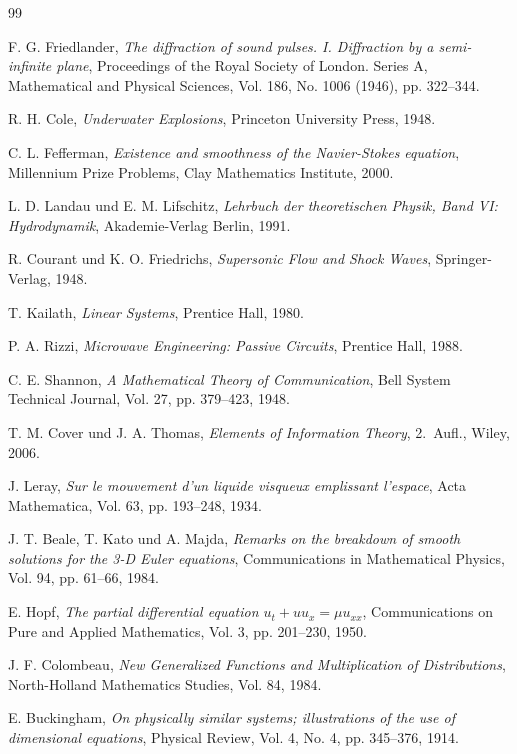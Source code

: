 ﻿\documentclass[12pt,a4paper]{article}
\theoremstyle{definition}
\theoremstyle{remark}
\begin{document}
\begin{thebibliography}{99}

F. G. Friedlander, \textit{The diffraction of sound pulses. I. Diffraction by a semi-infinite plane}, Proceedings of the Royal Society of London. Series A, Mathematical and Physical Sciences, Vol. 186, No. 1006 (1946), pp. 322--344.

R. H. Cole, \textit{Underwater Explosions}, Princeton University Press, 1948.

C. L. Fefferman, \textit{Existence and smoothness of the Navier-Stokes equation}, Millennium Prize Problems, Clay Mathematics Institute, 2000.

L. D. Landau und E. M. Lifschitz, \textit{Lehrbuch der theoretischen Physik, Band VI: Hydrodynamik}, Akademie-Verlag Berlin, 1991.

R. Courant und K. O. Friedrichs, \textit{Supersonic Flow and Shock Waves}, Springer-Verlag, 1948.

T. Kailath, \textit{Linear Systems}, Prentice Hall, 1980.

P. A. Rizzi, \textit{Microwave Engineering: Passive Circuits}, Prentice Hall, 1988.

C. E. Shannon, \textit{A Mathematical Theory of Communication}, Bell System Technical Journal, Vol. 27, pp. 379--423, 1948.

T. M. Cover und J. A. Thomas, \textit{Elements of Information Theory}, 2.~Aufl., Wiley, 2006.

J. Leray, \textit{Sur le mouvement d'un liquide visqueux emplissant l'espace}, Acta Mathematica, Vol. 63, pp. 193--248, 1934.

J. T. Beale, T. Kato und A. Majda, \textit{Remarks on the breakdown of smooth solutions for the 3-D Euler equations}, Communications in Mathematical Physics, Vol. 94, pp. 61--66, 1984.

E. Hopf, \textit{The partial differential equation $u_t + uu_x = \mu u_{xx}$}, Communications on Pure and Applied Mathematics, Vol. 3, pp. 201--230, 1950.

J. F. Colombeau, \textit{New Generalized Functions and Multiplication of Distributions}, North-Holland Mathematics Studies, Vol. 84, 1984.

E. Buckingham, \textit{On physically similar systems; illustrations of the use of dimensional equations}, Physical Review, Vol. 4, No. 4, pp. 345--376, 1914.


\end{thebibliography}
\end{document}
